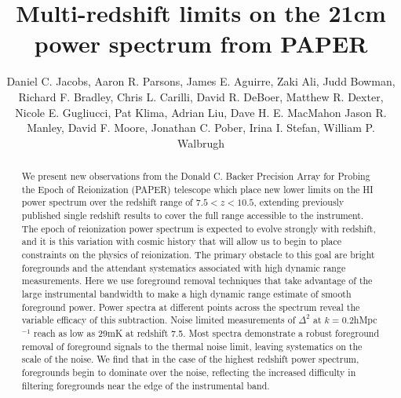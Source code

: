\documentclass[preprint]{aastex}
\begin{document}
\title{Multi-redshift limits on the 21cm power spectrum from PAPER}
\author{
Daniel C. Jacobs,
Aaron R. Parsons,
James E. Aguirre,
Zaki Ali,
Judd Bowman,
Richard F. Bradley,
Chris L.  Carilli,
David R. DeBoer,
Matthew R. Dexter,
Nicole E. Gugliucci,
Pat Klima,
Adrian Liu,
Dave H. E. MacMahon
Jason R. Manley,
David F. Moore,
Jonathan C. Pober,
Irina I. Stefan,
William P. Walbrugh}


\begin{abstract}
We present new observations from the Donald C. Backer Precision Array for Probing the Epoch of Reionization (PAPER) telescope which place new lower limits on the HI power spectrum over the redshift range of $7.5<z<10.5$, extending previously published single redshift results to cover the full range accessible to the instrument. The epoch of reionization power spectrum is expected to evolve strongly with redshift, and it is this variation with cosmic history that will allow us to begin to place constraints on the physics of reionization.  The primary obstacle to this goal are bright foregrounds and the attendant systematics associated with high dynamic range measurements. Here we use foreground removal techniques that take advantage of the large instrumental bandwidth to make a high dynamic range estimate of smooth foreground power.  Power spectra at different points across the spectrum reveal the variable efficacy of this subtraction.  Noise limited measurements of $\Delta^2$ at $k=$0.2hMpc$^{-1}$ reach as low as 29mK at redshift 7.5.  Most spectra demonstrate a robust foreground removal of foreground signals to the thermal noise limit, leaving systematics on the scale of the noise. We find that in the case of the highest redshift power spectrum, foregrounds begin to dominate over the noise, reflecting the increased difficulty in filtering foregrounds near the edge of the instrumental band.
\end{abstract}
\end{document}
